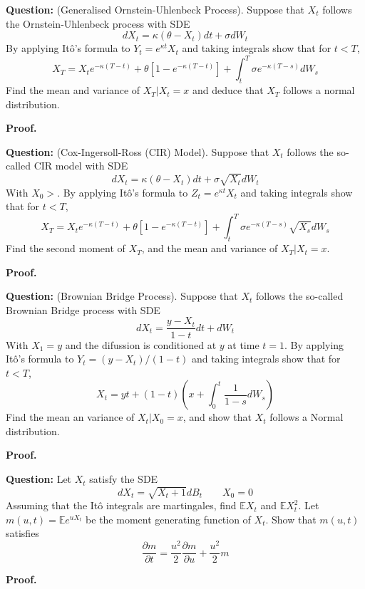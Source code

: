 \documentclass{article}
\begin{document}
\begin{tcolorbox}[colframe=black,colback=gray!5,boxrule=0.5pt]
\textbf{Question:} (Generalised Ornstein-Uhlenbeck Process). Suppose that $X_t$ follows the Ornstein-Uhlenbeck process with SDE
$$dX_t = \kappa(\theta-X_t)dt + \sigma dW_t$$
By applying Itô's formula to $Y_t=e^{\kappa t}X_t$ and taking integrals show that for $t<T$,
$$X_T = X_te^{-\kappa(T-t)}+\theta[1-e^{-\kappa(T-t)}] + \int_t^T\sigma e^{-\kappa(T-s)}dW_s$$
Find the mean and variance of $X_T | X_t=x$ and deduce that $X_T$ follows a normal distribution.
\end{tcolorbox}
\textbf{Proof.}


\begin{tcolorbox}[colframe=black,colback=gray!5,boxrule=0.5pt]
\textbf{Question:} (Cox-Ingersoll-Ross (CIR) Model). Suppose that $X_t$ follows the so-called CIR model with SDE
$$dX_t =\kappa(\theta-X_t)dt + \sigma\sqrt{X_t}dW_t$$
With $X_0>$. By applying Itô's formula to $Z_t=e^{\kappa t}X_t$ and taking integrals show that for $t<T$,
$$X_T = X_te^{-\kappa(T-t)}+\theta[1-e^{-\kappa(T-t)}] + \int_t^T\sigma e^{-\kappa(T-s)}\sqrt{X_s}dW_s$$
Find the second moment of $X_T$, and the mean and variance of $X_T | X_t=x$.
\end{tcolorbox}
\textbf{Proof.}


\begin{tcolorbox}[colframe=black,colback=gray!5,boxrule=0.5pt]
\textbf{Question:} (Brownian Bridge Process). Suppose that $X_t$ follows the so-called Brownian Bridge process with SDE
$$dX_t = \frac{y-X_t}{1-t}dt + dW_t$$
With $X_1=y$ and the difussion is conditioned at $y$ at time $t=1$.
By applying Itô's formula to $Y_t = (y-X_t)/(1-t)$ and taking integrals show that for $t<T$,
$$X_t = yt + (1-t)\left(x+\int_0^t\frac{1}{1-s}dW_s\right)$$
Find the mean an variance of $X_t| X_0=x$, and show that $X_t$ follows a Normal distribution.
\end{tcolorbox}
\textbf{Proof.}


\begin{tcolorbox}[colframe=black,colback=gray!5,boxrule=0.5pt]
\textbf{Question:} Let $X_t$ satisfy the SDE 
$$dX_t = \sqrt{X_t+1}dB_t \quad\quad X_0=0$$
Assuming that the Itô integrals are martingales, find $\mathbb{E}X_t$ and $\mathbb{E}X_t^2$. Let $m(u,t)=\mathbb{E}e^{uX_t}$ be the moment generating function of $X_t$. Show that $m(u,t)$ satisfies
$$\frac{\partial m}{\partial t} = \frac{u^2}{2}\frac{\partial m}{\partial u} + \frac{u^2}{2}m$$
\end{tcolorbox}
\textbf{Proof.}
\end{document}
